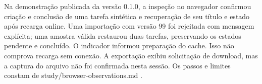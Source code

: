 Na demonstração publicada da versão 0.1.0, a inspeção no navegador confirmou criação e conclusão de uma tarefa sintética e recuperação de seu título e estado após recarga online. Uma importação com versão 99 foi rejeitada com mensagem explícita; uma amostra válida restaurou duas tarefas, preservando os estados pendente e concluído. O indicador informou preparação do cache. Isso não comprova recarga sem conexão. A exportação exibiu solicitação de download, mas a captura do arquivo não foi confirmada nesta sessão. Os passos e limites constam de study/browser-observations.md .
